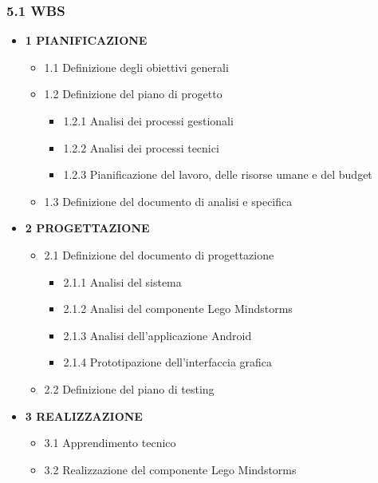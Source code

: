 \documentclass[]{article}
\providecommand{\tightlist}{%
  \setlength{\itemsep}{0pt}\setlength{\parskip}{0pt}}
\begin{document}
\hypertarget{wbs}{%
\subsubsection{5.1 WBS}\label{wbs}}

\begin{itemize}
\tightlist
\item
  \textbf{1 PIANIFICAZIONE}

  \begin{itemize}
  \tightlist
  \item
    1.1 Definizione degli obiettivi generali
  \item
    1.2 Definizione del piano di progetto

    \begin{itemize}
    \tightlist
    \item
      1.2.1 Analisi dei processi gestionali
    \item
      1.2.2 Analisi dei processi tecnici
    \item
      1.2.3 Pianificazione del lavoro, delle risorse umane e del budget
    \end{itemize}
  \item
    1.3 Definizione del documento di analisi e specifica
  \end{itemize}
\item
  \textbf{2 PROGETTAZIONE}

  \begin{itemize}
  \tightlist
  \item
    2.1 Definizione del documento di progettazione

    \begin{itemize}
    \tightlist
    \item
      2.1.1 Analisi del sistema
    \item
      2.1.2 Analisi del componente Lego Mindstorms
    \item
      2.1.3 Analisi dell'applicazione Android
    \item
      2.1.4 Prototipazione dell'interfaccia grafica
    \end{itemize}
  \item
    2.2 Definizione del piano di testing
  \end{itemize}
\item
  \textbf{3 REALIZZAZIONE}

  \begin{itemize}
  \tightlist
  \item
    3.1 Apprendimento tecnico
  \item
    3.2 Realizzazione del componente Lego Mindstorms


\end{itemize}
\end{itemize}
\end{document}
